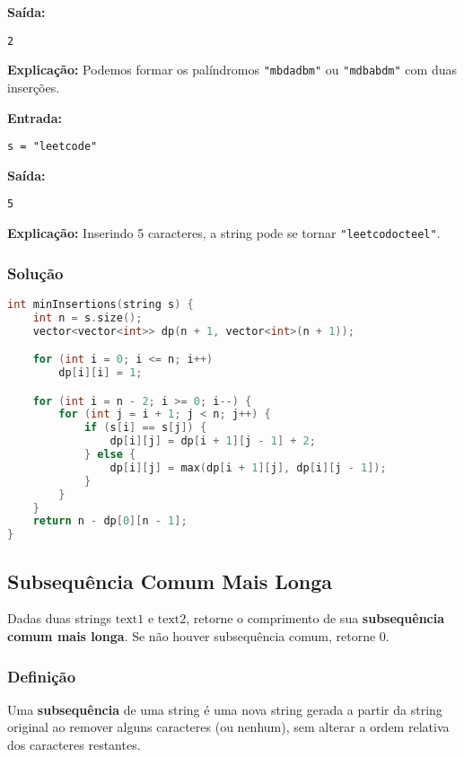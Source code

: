 \textbf{Saída:}
\begin{verbatim}
2
\end{verbatim}

\textbf{Explicação:} Podemos formar os palíndromos \texttt{"mbdadbm"} ou \texttt{"mdbabdm"} com duas inserções.

\bigskip
\textbf{Entrada:}
\begin{verbatim}
s = "leetcode"
\end{verbatim}

\textbf{Saída:}
\begin{verbatim}
5
\end{verbatim}

\textbf{Explicação:} Inserindo 5 caracteres, a string pode se tornar \texttt{"leetcodocteel"}.

\subsubsection*{Solução}
\begin{lstlisting}[language=C++]
int minInsertions(string s) {
    int n = s.size();
    vector<vector<int>> dp(n + 1, vector<int>(n + 1));

    for (int i = 0; i <= n; i++)
        dp[i][i] = 1;

    for (int i = n - 2; i >= 0; i--) {
        for (int j = i + 1; j < n; j++) {
            if (s[i] == s[j]) {
                dp[i][j] = dp[i + 1][j - 1] + 2;
            } else {
                dp[i][j] = max(dp[i + 1][j], dp[i][j - 1]);
            }
        }
    }
    return n - dp[0][n - 1];
}
\end{lstlisting}

\subsection{Subsequência Comum Mais Longa}

Dadas duas strings \( \text{text1} \) e \( \text{text2} \), retorne o comprimento de sua \textbf{subsequência comum mais longa}. Se não houver subsequência comum, retorne \( 0 \).

\subsubsection*{Definição}
Uma \textbf{subsequência} de uma string é uma nova string gerada a partir da string original ao remover alguns caracteres (ou nenhum), sem alterar a ordem relativa dos caracteres restantes.

